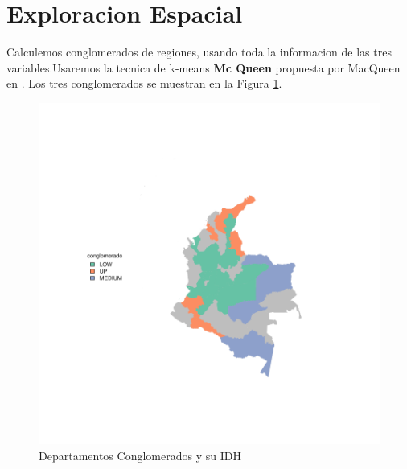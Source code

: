 \documentclass{article}
\begin{document}

\section{Exploracion Espacial}\label{Exporacion}

Calculemos conglomerados de regiones, usando toda la informacion de las tres variables.Usaremos la tecnica de k-means {\bf Mc Queen} propuesta por MacQueen en \cite{gower_general_1971}. Los tres conglomerados se muestran en la Figura \ref{clustmap}.



\begin{figure}[h]
\centering

\includegraphics{ProyectoFinal-plotMap1}
\caption{Departamentos Conglomerados y su IDH}
\label{clustmap}
\end{figure}


\renewcommand{\refname}{Bibliografia}

\end{document}
